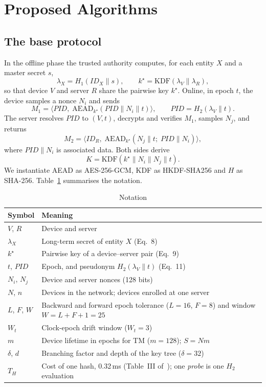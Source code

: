 \section{Proposed Algorithms}
\subsection*{The base protocol}
In the offline phase the trusted authority computes, for each entity $X$ and a master secret $s$,
\begin{equation}
\lambda_X = H_1(ID_X\|s), \qquad k^\star = \mathrm{KDF}(\lambda_V\|\lambda_R),
\end{equation}
so that device $V$ and server $R$ share the pairwise key $k^\star$. Online, in epoch $t$, the device samples a nonce $N_i$ and sends
\begin{equation}
M_1=\langle PID,\;\mathrm{AEAD}_{k^\star}(PID\|N_i\|t)\rangle,\qquad PID=H_2(\lambda_V\|t).
\end{equation}
The server resolves $PID$ to $(V,t)$, decrypts and verifies $M_1$, samples $N_j$, and returns
\begin{equation}
M_2=\langle ID_R,\;\mathrm{AEAD}_{k^\star}(N_j\|t;\;PID\|N_i)\rangle ,
\end{equation}
where $PID\|N_i$ is associated data. Both sides derive
\begin{equation}
K=\mathrm{KDF}(k^\star\|N_i\|N_j\|t).
\end{equation}
We instantiate AEAD as AES-256-GCM, KDF as HKDF-SHA256 and $H$ as SHA-256. Table~\ref{tab:notation} summarises the notation.

\begin{table}[H]
\centering
\caption{Notation}
\label{tab:notation}
\small
\begin{tabular}{|l|p{}|}
\hline
\textbf{Symbol} & \textbf{Meaning}\\ \hline
$V$, $R$ & Device and server\\ \hline
$\lambda_X$ & Long-term secret of entity $X$ (Eq.~8)\\ \hline
$k^\star$ & Pairwise key of a device--server pair (Eq.~9)\\ \hline
$t$, $PID$ & Epoch, and pseudonym $H_2(\lambda_V\|t)$ (Eq.~11)\\ \hline
$N_i$, $N_j$ & Device and server nonces (128 bits)\\ \hline
$N$, $n$ & Devices in the network; devices enrolled at one server\\ \hline
$L$, $F$, $W$ & Backward and forward epoch tolerance ($L=16$, $F=8$) and window $W=L+F+1=25$\\ \hline
$W_t$ & Clock-epoch drift window ($W_t=3$)\\ \hline
$m$ & Device lifetime in epochs for TM ($m=128$); $S=Nm$\\ \hline
$\delta$, $d$ & Branching factor and depth of the key tree ($\delta=32$)\\ \hline
$T_H$ & Cost of one hash, 0.32\,ms (Table~III of~\cite{base}); one \emph{probe} is one $H_2$ evaluation\\ \hline
\end{tabular}
\end{table}


